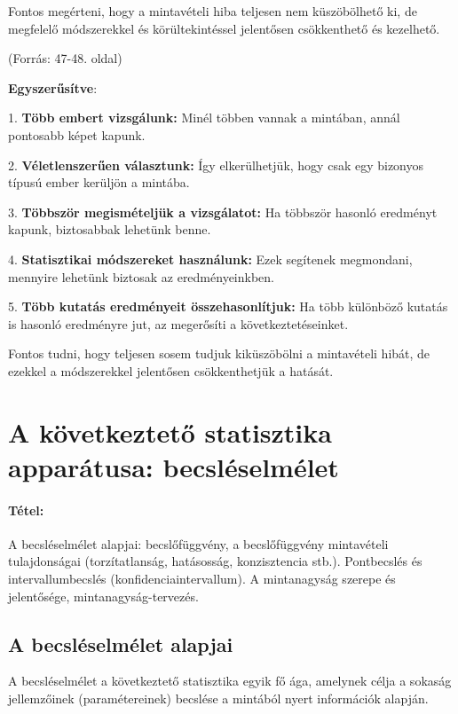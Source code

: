 \documentclass[a4paper,12pt]{article}
\begin{document}
    Fontos megérteni, hogy a mintavételi hiba teljesen nem küszöbölhető ki, de megfelelő módszerekkel és körültekintéssel jelentősen csökkenthető és kezelhető.

    (Forrás: 47-48. oldal)

    \textbf{Egyszerűsítve}:

    1. \textbf{Több embert vizsgálunk:} Minél többen vannak a mintában, annál pontosabb képet kapunk.

    2. \textbf{Véletlenszerűen választunk:} Így elkerülhetjük, hogy csak egy bizonyos típusú ember kerüljön a mintába.

    3. \textbf{Többször megismételjük a vizsgálatot:} Ha többször hasonló eredményt kapunk, biztosabbak lehetünk benne.

    4. \textbf{Statisztikai módszereket használunk:} Ezek segítenek megmondani, mennyire lehetünk biztosak az eredményeinkben.

    5. \textbf{Több kutatás eredményeit összehasonlítjuk:} Ha több különböző kutatás is hasonló eredményre jut, az megerősíti a következtetéseinket.

    Fontos tudni, hogy teljesen sosem tudjuk kiküszöbölni a mintavételi hibát, de ezekkel a módszerekkel jelentősen csökkenthetjük a hatását.

    \newpage


    \section{A következtető statisztika apparátusa: becsléselmélet}

    \paragraph{Tétel:} A becsléselmélet alapjai: becslőfüggvény, a becslőfüggvény mintavételi tulajdonságai
    (torzítatlanság, hatásosság, konzisztencia stb.). Pontbecslés és intervallumbecslés
    (konfidenciaintervallum). A mintanagyság szerepe és jelentősége, mintanagyság-tervezés.

    \subsection{A becsléselmélet alapjai}

    A becsléselmélet a következtető statisztika egyik fő ága, amelynek célja a sokaság jellemzőinek (paramétereinek) becslése a mintából nyert információk alapján.
\end{document}
